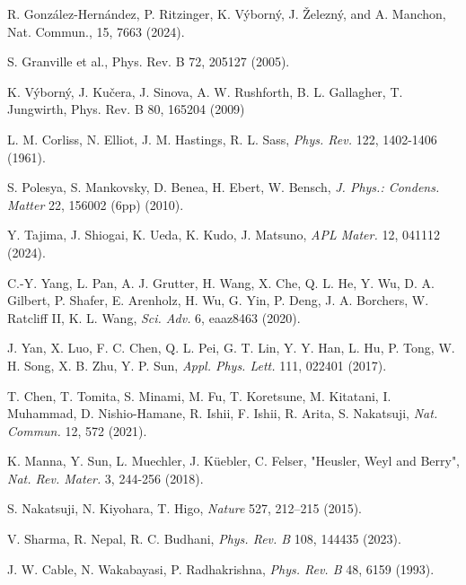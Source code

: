 \documentclass[prb,showpacs,amsmath,amssymb,superscriptaddress,twocolumn,floatfix]{revtex4-1}
\begin{document}
\begin{thebibliography}{99}
 R. Gonz\'alez-Hern\'andez, P. Ritzinger, K. V\'yborn\'y, J. \v{Z}elezn\'y, and A. Manchon, Nat. Commun., 15, 7663 (2024).%

S. Granville et al., Phys. Rev. B 72, 205127 (2005).

 K. V\'{y}born\'{y}, J. Ku\v{c}era, J. Sinova, A. W. Rushforth, B. L. Gallagher, T. Jungwirth, Phys. Rev. B 80, 165204 (2009)%

 L. M. Corliss, N. Elliot, J. M. Hastings, R. L. Sass, \textit{Phys. Rev.} 122, 1402-1406 (1961). %

 S. Polesya, S. Mankovsky, D. Benea, H. Ebert, W. Bensch, \textit{J. Phys.: Condens. Matter} 22, 156002 (6pp) (2010). %

 Y. Tajima, J. Shiogai, K. Ueda, K. Kudo, J. Matsuno, \textit{APL Mater.} 12, 041112 (2024). %

 C.-Y. Yang, L. Pan, A. J. Grutter, H. Wang, X. Che, Q. L. He, Y. Wu, D. A. Gilbert, P. Shafer, E. Arenholz, H. Wu, G. Yin, P. Deng, J. A. Borchers, W. Ratcliff II, K. L. Wang, \textit{Sci. Adv.} 6, eaaz8463 (2020). %

 J. Yan, X. Luo, F. C. Chen, Q. L. Pei, G. T. Lin, Y. Y. Han, L. Hu, P. Tong, W. H. Song, X. B. Zhu, Y. P. Sun, \textit{Appl. Phys. Lett.} 111, 022401 (2017). %

 T. Chen, T. Tomita, S. Minami, M. Fu, T. Koretsune, M. Kitatani, I. Muhammad, D. Nishio-Hamane, R. Ishii, F. Ishii, R. Arita, S. Nakatsuji, \textit{Nat. Commun.} 12, 572 (2021). %

 K. Manna, Y. Sun, L. Muechler, J. K\"uebler, C. Felser, "Heusler, Weyl and Berry", \textit{Nat. Rev. Mater.} 3, 244-256 (2018). %

 S. Nakatsuji, N. Kiyohara, T. Higo, \textit{Nature} 527, 212–215 (2015). %

 V. Sharma, R. Nepal, R. C. Budhani, \textit{Phys. Rev. B} 108, 144435 (2023). %

 J. W. Cable, N. Wakabayasi, P. Radhakrishna, \textit{Phys. Rev. B} 48, 6159 (1993). %


\end{thebibliography}
\end{document}
